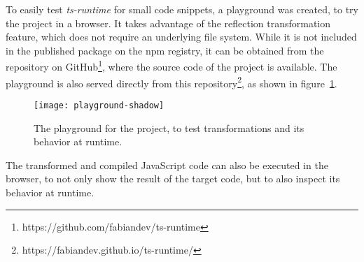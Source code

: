 To easily test \emph{ts-runtime} for small code snippets, a playground was created, to try the project in a browser. It takes advantage of the reflection transformation feature, which does not require an underlying file system. While it is not included in the published package on the npm registry, it can be obtained from the repository on GitHub\footnote{https://github.com/fabiandev/ts-runtime}, where the source code of the project is available. The playground is also served directly from this repository\footnote{https://fabiandev.github.io/ts-runtime/}, as shown in figure~\ref{fig:playground}.
\begin{figure}
\centering
\texttt{[image: playground-shadow]}
\caption{The playground for the project, to test transformations and its behavior at runtime.}
\label{fig:playground}
\end{figure}
The transformed and compiled JavaScript code can also be executed in the browser, to not only show the result of the target code, but to also inspect its behavior at runtime.







